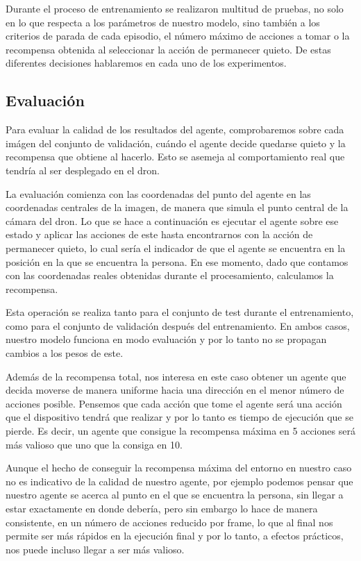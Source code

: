 Durante el proceso de entrenamiento se realizaron multitud de pruebas, no solo en lo que respecta a los parámetros de nuestro modelo, sino también a los criterios de parada de cada episodio, el número máximo de acciones a tomar o la recompensa obtenida al seleccionar la acción de permanecer quieto. De estas diferentes decisiones hablaremos en cada uno de los experimentos.
\medskip

\subsection{Evaluación}
\label{evaluacion}

Para evaluar la calidad de los resultados del agente, comprobaremos sobre cada imágen del conjunto de validación, cuándo el agente decide quedarse quieto y la recompensa que obtiene al hacerlo. Esto se asemeja al comportamiento real que tendría al ser desplegado en el dron.
\medskip

La evaluación comienza con las coordenadas del punto del agente en las coordenadas centrales de la imagen, de manera que simula el punto central de la cámara del dron. Lo que se hace a continuación es ejecutar el agente sobre ese estado y aplicar las acciones de este hasta encontrarnos con la acción de permanecer quieto, lo cual sería el indicador de que el agente se encuentra en la posición en la que se encuentra la persona. En ese momento, dado que contamos con las coordenadas reales obtenidas durante el procesamiento, calculamos la recompensa.
\medskip

Esta operación se realiza tanto para el conjunto de test durante el entrenamiento, como para el conjunto de validación después del entrenamiento. En ambos casos, nuestro modelo funciona en modo evaluación y por lo tanto no se propagan cambios a los pesos de este.
\medskip

Además de la recompensa total, nos interesa en este caso obtener un agente que decida moverse de manera uniforme hacia una dirección en el menor número de acciones posible. Pensemos que cada acción que tome el agente será una acción que el dispositivo tendrá que realizar y por lo tanto es tiempo de ejecución que se pierde. Es decir, un agente que consigue la recompensa máxima en 5 acciones será más valioso que uno que la consiga en 10.
\medskip

Aunque el hecho de conseguir la recompensa máxima del entorno en nuestro caso no es indicativo de la calidad de nuestro agente, por ejemplo podemos pensar que nuestro agente se acerca al punto en el que se encuentra la persona, sin llegar a estar exactamente en donde debería, pero sin embargo lo hace de manera consistente, en un número de acciones reducido por frame, lo que al final nos permite ser más rápidos en la ejecución final y por lo tanto, a efectos prácticos, nos puede incluso llegar a ser más valioso.
\medskip

